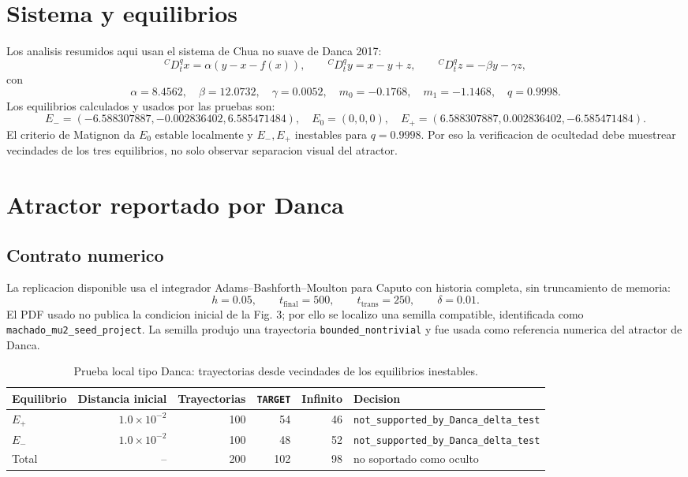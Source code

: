 \documentclass[11pt]{article}
\newcommand{\status}[1]{\texttt{\small #1}}
\newcommand{\target}{\texttt{TARGET}}
\newcommand{\qmain}{0.9998}
\newcommand{\Ezero}{E_0}
\newcommand{\Eplus}{E_+}
\newcommand{\Eminus}{E_-}
\begin{document}
\section{Sistema y equilibrios}

Los analisis resumidos aqui usan el sistema de Chua no suave de Danca 2017:
\[
{}^C D_t^q x = \alpha(y-x-f(x)),\qquad
{}^C D_t^q y = x-y+z,\qquad
{}^C D_t^q z = -\beta y-\gamma z,
\]
con
\[
\alpha=8.4562,\quad \beta=12.0732,\quad \gamma=0.0052,\quad
m_0=-0.1768,\quad m_1=-1.1468,\quad q=\qmain.
\]
Los equilibrios calculados y usados por las pruebas son:
\[
\Eminus=(-6.588307887,-0.002836402,6.585471484),\quad
\Ezero=(0,0,0),\quad
\Eplus=(6.588307887,0.002836402,-6.585471484).
\]
El criterio de Matignon da \(\Ezero\) estable localmente y \(\Eminus,\Eplus\)
inestables para \(q=\qmain\). Por eso la verificacion de ocultedad debe
muestrear vecindades de los tres equilibrios, no solo observar separacion
visual del atractor.

\section{Atractor reportado por Danca}

\subsection{Contrato numerico}

La replicacion disponible usa el integrador Adams--Bashforth--Moulton para
Caputo con historia completa, sin truncamiento de memoria:
\[
h=0.05,\qquad t_{\mathrm{final}}=500,\qquad
t_{\mathrm{trans}}=250,\qquad \delta=0.01.
\]
El PDF usado no publica la condicion inicial de la Fig. 3; por ello se localizo
una semilla compatible, identificada como
\status{machado\_mu2\_seed\_project}. La semilla produjo una trayectoria
\status{bounded\_nontrivial} y fue usada como referencia numerica del atractor
de Danca.

\begin{table}[h]
\centering
\caption{Prueba local tipo Danca: trayectorias desde vecindades de los equilibrios inestables.}
\small
\begin{tabular}{lrrrrl}
\toprule
Equilibrio & Distancia inicial & Trayectorias & \target{} & Infinito & Decision \\
\midrule
\(\Eplus\)  & \(1.0\times10^{-2}\) & 100 & 54 & 46 & \status{not\_supported\_by\_Danca\_delta\_test} \\
\(\Eminus\) & \(1.0\times10^{-2}\) & 100 & 48 & 52 & \status{not\_supported\_by\_Danca\_delta\_test} \\
\midrule
Total & -- & 200 & 102 & 98 & no soportado como oculto \\
\bottomrule
\end{tabular}
\end{table}
\end{document}
